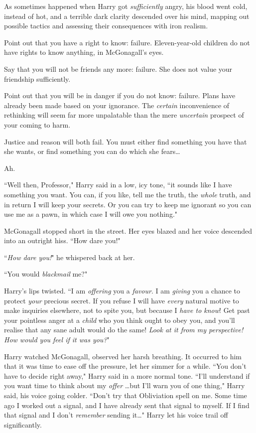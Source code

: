 As sometimes happened when Harry got \emph{sufficiently} angry, his blood went cold, instead of hot, and a terrible dark clarity descended over his mind, mapping out possible tactics and assessing their consequences with iron realism.

\begin{em}
Point out that you have a right to know: failure. Eleven-year-old children do not have rights to know anything, in McGonagall's eyes.

Say that you will not be friends any more: failure. She does not value your friendship sufficiently.

Point out that you will be in danger if you do not know: failure. Plans have already been made based on your ignorance. The \emph{certain} inconvenience of rethinking will seem far more unpalatable than the mere \emph{uncertain} prospect of your coming to harm.

Justice and reason will both fail. You must either find something you have that she wants, or find something you can do which she fears{\ldots}
\end{em}

Ah.

``Well then, Professor," Harry said in a low, icy tone, ``it sounds like I have something you want. You can, if you like, tell me the truth, the \emph{whole} truth, and in return I will keep your secrets. Or you can try to keep me ignorant so you can use me as a pawn, in which case I will owe you nothing."

McGonagall stopped short in the street. Her eyes blazed and her voice descended into an outright hiss. ``How dare you!"

``\emph{How dare you!}" he whispered back at her.

``You would \emph{blackmail} me?"

Harry's lips twisted. ``I am \emph{offering} you a \emph{favour}. I am \emph{giving} you a chance to protect \emph{your} precious secret. If you refuse I will have \emph{every} natural motive to make inquiries elsewhere, not to spite you, but because I \emph{have to know}! Get past your pointless anger at a \emph{child} who you think ought to obey you, and you'll realise that any sane adult would do the same! \emph{Look at it from my perspective! How would you feel if it was \emph{you}?}"

Harry watched McGonagall, observed her harsh breathing. It occurred to him that it was time to ease off the pressure, let her simmer for a while. ``You don't have to decide right away," Harry said in a more normal tone. ``I'll understand if you want time to think about my \emph{offer} {\ldots}but I'll warn you of one thing," Harry said, his voice going colder. ``Don't try that Obliviation spell on me. Some time ago I worked out a signal, and I have already sent that signal to myself. If I find that signal and I don't \emph{remember} sending it{\ldots}" Harry let his voice trail off significantly.

